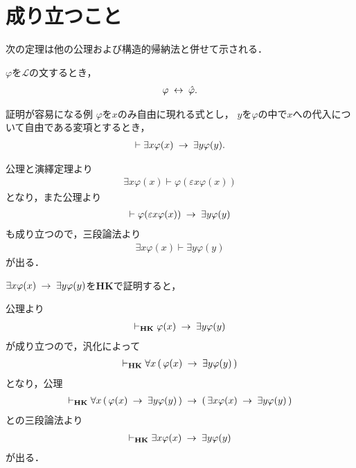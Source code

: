 \section{成り立つこと}
	次の定理は他の公理および構造的帰納法と併せて示される．
	
	\begin{screen}
		\begin{thm}[書き換えの同値性]
			$\varphi$を$\mathcal{L}$の文するとき，
			\begin{align}
				\varphi \hspace{0.25em}\leftrightarrow\hspace{0.25em} \hat{\varphi}.
			\end{align}
		\end{thm}
	\end{screen}

\newpage
	\begin{itembox}[l]{証明が容易になる例}
		$\varphi$を$x$のみ自由に現れる式とし，
		$y$を$\varphi$の中で$x$への代入について自由である変項とするとき，
		\begin{align}
			\vdash \exists x \varphi(x) \hspace{0.25em}\rightarrow\hspace{0.25em} \exists y \varphi(y).
		\end{align}
	\end{itembox}
	
	\begin{sketch}
		公理と演繹定理より
		\begin{align}
			\exists x \varphi(x) \vdash \varphi(\varepsilon x \varphi(x))
		\end{align}
		となり，また公理より
		\begin{align}
			\vdash \varphi(\varepsilon x \varphi(x))
			\hspace{0.25em}\rightarrow\hspace{0.25em} \exists y \varphi(y)
		\end{align}
		も成り立つので，三段論法より
		\begin{align}
			\exists x \varphi(x) \vdash \exists y \varphi(y)
		\end{align}
		が出る．
		\QED
	\end{sketch}

\newpage
	$\exists x \varphi(x) \hspace{0.25em}\rightarrow\hspace{0.25em} \exists y \varphi(y)$を{\bf HK}で証明すると，
	
	公理より
	\begin{align}
		\vdash_{{\scriptsize \mbox{{\bf HK}}}} \varphi(x) \hspace{0.25em}\rightarrow\hspace{0.25em} \exists y \varphi(y)
	\end{align}
	が成り立つので，汎化によって
	\begin{align}
		\vdash_{{\scriptsize \mbox{{\bf HK}}}} \forall x\, (\, \varphi(x) \hspace{0.25em}\rightarrow\hspace{0.25em} \exists y \varphi(y)\, )
	\end{align}
	となり，公理
	\begin{align}
		\vdash_{{\scriptsize \mbox{{\bf HK}}}} \forall x\, (\, \varphi(x) \hspace{0.25em}\rightarrow\hspace{0.25em} \exists y \varphi(y)\, )
		\hspace{0.25em}\rightarrow\hspace{0.25em} (\, \exists x \varphi(x) \hspace{0.25em}\rightarrow\hspace{0.25em} \exists y \varphi(y)\, )
	\end{align}
	との三段論法より
	\begin{align}
		\vdash_{{\scriptsize \mbox{{\bf HK}}}} \exists x \varphi(x) \hspace{0.25em}\rightarrow\hspace{0.25em} \exists y \varphi(y)
	\end{align}
	が出る．

